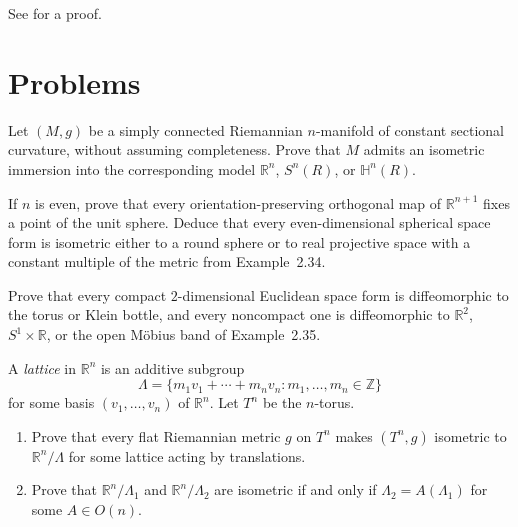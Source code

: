See \cite{Bre10} for a proof.
\section{Problems}

\begin{exercise}
\label{prob:constant-sectional-curvature-immersion}

Let $(M,g)$ be a simply connected Riemannian $n$-manifold of constant
sectional curvature, without assuming completeness. Prove that $M$ admits an
isometric immersion into the corresponding model
$\mathbb R^n$, $S^n(R)$, or $\mathbb H^n(R)$.
\end{exercise}

\begin{exercise}
\label{prob:fixed-points-orthogonal-map}

If $n$ is even, prove that every orientation-preserving orthogonal map of
$\mathbb R^{n+1}$ fixes a point of the unit sphere. Deduce that every
even-dimensional spherical space form is isometric either to a round sphere
or to real projective space with a constant multiple of the metric from
Example~2.34.
\end{exercise}

\begin{exercise}
\label{prob:compact-euclidean-space-forms}

Prove that every compact $2$-dimensional Euclidean space form is
diffeomorphic to the torus or Klein bottle, and every noncompact one is
diffeomorphic to $\mathbb R^2$, $S^1\times\mathbb R$, or the open
Möbius band of Example~2.35.
\end{exercise}

\begin{exercise}
\label{prob:lattices-flat-tori}

A \emph{lattice} in $\mathbb R^n$ is an additive subgroup
\[
\Lambda=
\{m_1v_1+\cdots+m_nv_n:m_1,\ldots,m_n\in\mathbb Z\}
\]
for some basis $(v_1,\ldots,v_n)$ of $\mathbb R^n$. Let $T^n$ be the
$n$-torus.
\begin{enumerate}
\item[(a)] Prove that every flat Riemannian metric $g$ on $T^n$ makes
$(T^n,g)$ isometric to $\mathbb R^n/\Lambda$ for some lattice acting by
translations.
\item[(b)] Prove that
$\mathbb R^n/\Lambda_1$ and $\mathbb R^n/\Lambda_2$ are isometric if and
only if $\Lambda_2=A(\Lambda_1)$ for some $A\in O(n)$.
\end{enumerate}
\end{exercise}

